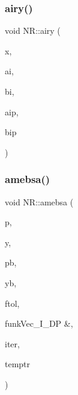 \subsubsection{\texorpdfstring{airy()}{airy()}}
{\footnotesize\ttfamily void N\+R\+::airy (\begin{DoxyParamCaption}\item[{const \mbox{\hyperlink{namespaceNR_af6ff762dd605ff477b8e52387253a02a}{DP}}}]{x,  }\item[{\mbox{\hyperlink{namespaceNR_af6ff762dd605ff477b8e52387253a02a}{DP}} \&}]{ai,  }\item[{\mbox{\hyperlink{namespaceNR_af6ff762dd605ff477b8e52387253a02a}{DP}} \&}]{bi,  }\item[{\mbox{\hyperlink{namespaceNR_af6ff762dd605ff477b8e52387253a02a}{DP}} \&}]{aip,  }\item[{\mbox{\hyperlink{namespaceNR_af6ff762dd605ff477b8e52387253a02a}{DP}} \&}]{bip }\end{DoxyParamCaption})}

\mbox{\label{namespaceNR_a268778b02b6b0174580ca6006fdbac02}} 
\subsubsection{\texorpdfstring{amebsa()}{amebsa()}}
{\footnotesize\ttfamily void N\+R\+::amebsa (\begin{DoxyParamCaption}\item[{\mbox{\hyperlink{namespaceNR_ad1513aa4697878ed3bff0b8b3c9dd910}{Mat\+\_\+\+I\+O\+\_\+\+DP}} \&}]{p,  }\item[{\mbox{\hyperlink{namespaceNR_ab293e06a6bf799d8a7ed932b6852bcb8}{Vec\+\_\+\+I\+O\+\_\+\+DP}} \&}]{y,  }\item[{\mbox{\hyperlink{namespaceNR_a970094d23441f8ef6a45282a7eb2103d}{Vec\+\_\+\+O\+\_\+\+DP}} \&}]{pb,  }\item[{\mbox{\hyperlink{namespaceNR_af6ff762dd605ff477b8e52387253a02a}{DP}} \&}]{yb,  }\item[{const \mbox{\hyperlink{namespaceNR_af6ff762dd605ff477b8e52387253a02a}{DP}}}]{ftol,  }\item[{\mbox{\hyperlink{namespaceNR_af6ff762dd605ff477b8e52387253a02a}{DP}} }]{funkVec\+\_\+\+I\+\_\+\+D\+P \&,  }\item[{int \&}]{iter,  }\item[{const \mbox{\hyperlink{namespaceNR_af6ff762dd605ff477b8e52387253a02a}{DP}}}]{temptr }\end{DoxyParamCaption})}

